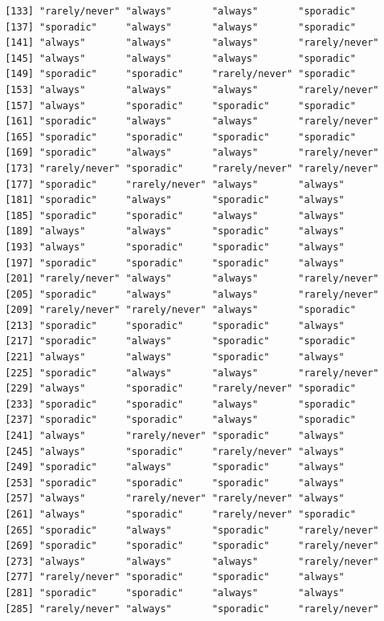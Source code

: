 \documentclass[
  letterpaper,
  DIV=11,
  numbers=noendperiod]{scrartcl}
\begin{document}
\begin{verbatim}
 [133] "rarely/never" "always"       "always"       "sporadic"    
 [137] "sporadic"     "always"       "always"       "sporadic"    
 [141] "always"       "always"       "always"       "rarely/never"
 [145] "always"       "always"       "always"       "sporadic"    
 [149] "sporadic"     "sporadic"     "rarely/never" "sporadic"    
 [153] "always"       "always"       "always"       "rarely/never"
 [157] "always"       "sporadic"     "sporadic"     "sporadic"    
 [161] "sporadic"     "always"       "always"       "rarely/never"
 [165] "sporadic"     "sporadic"     "sporadic"     "sporadic"    
 [169] "sporadic"     "always"       "always"       "rarely/never"
 [173] "rarely/never" "sporadic"     "rarely/never" "rarely/never"
 [177] "sporadic"     "rarely/never" "always"       "always"      
 [181] "sporadic"     "always"       "sporadic"     "always"      
 [185] "sporadic"     "sporadic"     "always"       "always"      
 [189] "always"       "always"       "sporadic"     "always"      
 [193] "always"       "sporadic"     "sporadic"     "always"      
 [197] "sporadic"     "sporadic"     "sporadic"     "always"      
 [201] "rarely/never" "always"       "always"       "rarely/never"
 [205] "sporadic"     "always"       "always"       "rarely/never"
 [209] "rarely/never" "rarely/never" "always"       "sporadic"    
 [213] "sporadic"     "sporadic"     "sporadic"     "always"      
 [217] "sporadic"     "always"       "sporadic"     "sporadic"    
 [221] "always"       "always"       "sporadic"     "always"      
 [225] "sporadic"     "always"       "always"       "rarely/never"
 [229] "always"       "sporadic"     "rarely/never" "sporadic"    
 [233] "sporadic"     "sporadic"     "always"       "sporadic"    
 [237] "sporadic"     "sporadic"     "always"       "sporadic"    
 [241] "always"       "rarely/never" "sporadic"     "always"      
 [245] "always"       "sporadic"     "rarely/never" "always"      
 [249] "sporadic"     "always"       "sporadic"     "always"      
 [253] "sporadic"     "sporadic"     "sporadic"     "always"      
 [257] "always"       "rarely/never" "rarely/never" "always"      
 [261] "always"       "sporadic"     "rarely/never" "sporadic"    
 [265] "sporadic"     "always"       "sporadic"     "rarely/never"
 [269] "sporadic"     "sporadic"     "sporadic"     "rarely/never"
 [273] "always"       "always"       "always"       "rarely/never"
 [277] "rarely/never" "sporadic"     "sporadic"     "always"      
 [281] "sporadic"     "sporadic"     "always"       "always"      
 [285] "rarely/never" "always"       "sporadic"     "rarely/never"

\end{verbatim}
\end{document}
